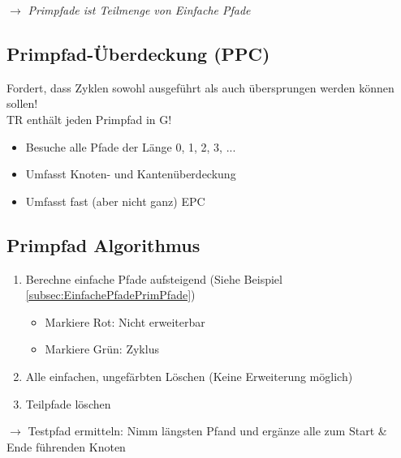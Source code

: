 \documentclass[11pt, a4paper]{article}
\begin{document}
\vspace{0.5em}

\tiny \raggedleft $\rightarrow$ \textit{Primpfade ist Teilmenge von Einfache Pfade}

\normalsize

\raggedright

\vspace{2em}

\subsection{Primpfad-Überdeckung (PPC)}

Fordert, dass Zyklen sowohl ausgeführt als auch übersprungen werden können sollen!\\
TR enthält jeden Primpfad in G!

\begin{itemize}
    \item Besuche alle Pfade der Länge 0, 1, 2, 3, ...
    \item Umfasst Knoten- und Kantenüberdeckung
    \item Umfasst fast (aber nicht ganz) EPC
\end{itemize}


\newpage

\subsection{Primpfad Algorithmus}

\vspace{1em}

\begin{enumerate}
    \item Berechne einfache Pfade aufsteigend (Siehe Beispiel \cref{subsec:EinfachePfadePrimPfade})
    \begin{itemize}
        \item Markiere {\color{BrickRed}Rot}: Nicht erweiterbar
        \item Markiere {\color{ForestGreen}Grün}: Zyklus
    \end{itemize}
    \item Alle einfachen, ungefärbten Löschen (Keine Erweiterung möglich)
    \item Teilpfade löschen
\end{enumerate}

$\rightarrow$ Testpfad ermitteln: Nimm längsten Pfand und ergänze alle zum Start \& Ende führenden Knoten
\end{document}
